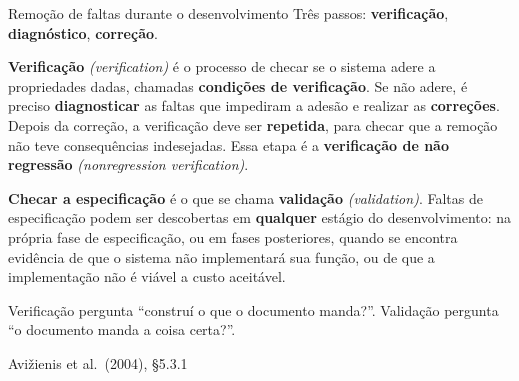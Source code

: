 \documentclass{beamer}
\newcommand{\en}[1]{{\color{depCinza}\textit{#1}}}
\newcommand{\sect}[1]{\par\smallskip\hfill{\tiny\color{black!55}Avi\v{z}ienis et al.\ (2004), #1}}
\begin{document}
\begin{frame}{Remo\c{c}\~ao de faltas durante o desenvolvimento}
    \footnotesize
    Tr\^es passos: \textbf{verifica\c{c}\~ao}, \textbf{diagn\'ostico}, \textbf{corre\c{c}\~ao}.
    \medskip
    \begin{defi}
        \scriptsize
        \textbf{Verifica\c{c}\~ao} \en{(verification)} \'e o processo de checar se o sistema adere a propriedades dadas, chamadas \textbf{condi\c{c}\~oes de verifica\c{c}\~ao}. Se n\~ao adere, \'e preciso \textbf{diagnosticar} as faltas que impediram a ades\~ao e realizar as \textbf{corre\c{c}\~oes}.\\[3pt]
        Depois da corre\c{c}\~ao, a verifica\c{c}\~ao deve ser \textbf{repetida}, para checar que a remo\c{c}\~ao n\~ao teve consequ\^encias indesejadas. Essa etapa \'e a \textbf{verifica\c{c}\~ao de n\~ao regress\~ao} \en{(nonregression verification)}.
    \end{defi}
    \medskip
    \begin{tcolorbox}[colback=depLaranja!8,colframe=depLaranja!70,boxrule=0.6pt,title={\scriptsize\bfseries Valida\c{c}\~ao \'e outra coisa}]
        \scriptsize
        \textbf{Checar a especifica\c{c}\~ao} \'e o que se chama \textbf{valida\c{c}\~ao} \en{(validation)}. Faltas de especifica\c{c}\~ao podem ser descobertas em \textbf{qualquer} est\'agio do desenvolvimento: na pr\'opria fase de especifica\c{c}\~ao, ou em fases posteriores, quando se encontra evid\^encia de que o sistema n\~ao implementar\'a sua fun\c{c}\~ao, ou de que a implementa\c{c}\~ao n\~ao \'e vi\'avel a custo aceit\'avel.
    \end{tcolorbox}
    \medskip
    \begin{ancora}
        \footnotesize
        Verifica\c{c}\~ao pergunta ``constru\'i o que o documento manda?''. Valida\c{c}\~ao pergunta ``o documento manda a coisa certa?''.
    \end{ancora}
    \sect{\S5.3.1}
\end{frame}
\end{document}
